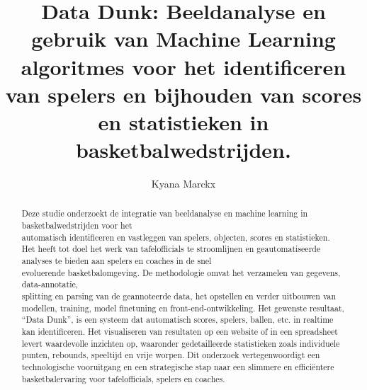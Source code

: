 \documentclass{hogent-article}
\title{Data Dunk: Beeldanalyse en gebruik van Machine Learning algoritmes voor het identificeren van spelers en bijhouden van scores en statistieken in \\basketbalwedstrijden.}
\author{Kyana Marckx}
\begin{document}
\begin{abstract}
  
  Deze studie onderzoekt de integratie van beeldanalyse en machine learning in basketbalwedstrijden voor het \\automatisch identificeren en vastleggen van spelers, objecten, scores en statistieken. Het heeft tot doel het werk van tafelofficials te stroomlijnen en geautomatiseerde analyses te bieden aan spelers en coaches in de snel \\evoluerende basketbalomgeving. De methodologie omvat het verzamelen van gegevens, data-annotatie, \\splitting en parsing van de geannoteerde data, het opstellen en verder uitbouwen van modellen, training, model finetuning en front-end-ontwikkeling. Het gewenste resultaat, ``Data Dunk'', is een systeem dat  automatisch scores, spelers, ballen, etc. in realtime kan identificeren. Het visualiseren van resultaten op een website of in een spreadsheet levert waardevolle inzichten op, waaronder gedetailleerde statistieken zoals individuele punten, rebounds, speeltijd en vrije worpen. Dit onderzoek vertegenwoordigt een technologische vooruitgang en een strategische stap naar een slimmere en efficiëntere basketbalervaring voor tafelofficials, spelers en coaches.
\end{abstract}

\tableofcontents




%
%

%
%
\printbibliography[heading=bibintoc]
\end{document}
